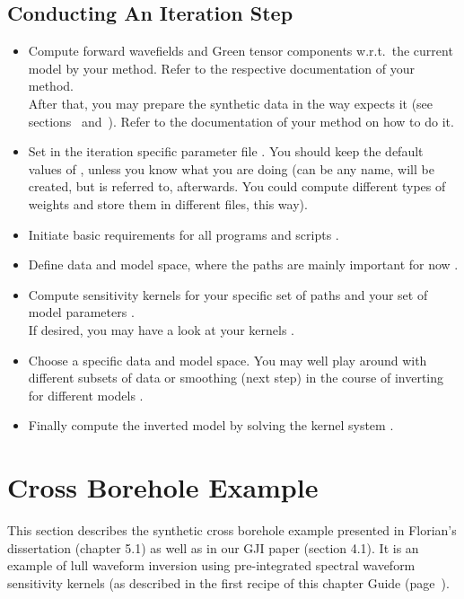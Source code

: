 \subsection*{Conducting An Iteration Step}
%
\begin{itemize}
\item Compute forward wavefields and Green tensor components w.r.t.\ the current model 
by your method. Refer to the respective documentation of your method.\\
After that, you may prepare the synthetic data in the way \ASKI expects it (see sections~ 
and~). Refer to the documentation of your method on how to do it.
%
\item Set  in the iteration specific parameter file 
.
You should keep the default values of ,
unless you know what you are doing (can be any name, will be created, but is referred to, afterwards. 
You could compute different types of weights and store them in different files, this way). 
%
\item Initiate basic requirements for all programs and scripts .
%
\item Define data and model space, where the paths are mainly important for now .
%
\item Compute sensitivity kernels for your specific set of paths and your set of model parameters 
  . \\
  If desired, you may have a look at your kernels .
%
\item Choose a specific data and model space. You may well play around with different subsets of data or
smoothing (next step) in the course of inverting for different models .
%
\item Finally compute the inverted model by solving the kernel system .
\end{itemize}
%
\newpage
\section*{Cross Borehole Example} \label{guide,sec:example_C_borehole}
%
This section describes the synthetic cross borehole example presented in Florian's dissertation 
\cite{_743d334d-dfa4-4a16-8cc5-91cdadc95271} (chapter 5.1) as well as in our GJI paper \cite{Schumacher16} 
(section 4.1). It is an example of lull waveform inversion using pre-integrated spectral waveform sensitivity 
kernels (as described in the first recipe of this chapter Guide (page~\pageref{guide}).

